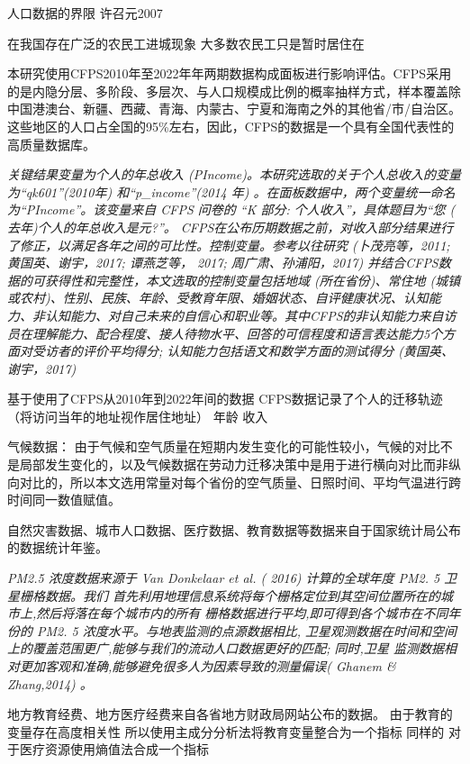 \documentclass[a4paper,12pt,oneside, fontset=mac]{ctexbook} %
\begin{document}
人口数据的界限
许召元2007

在我国存在广泛的农民工进城现象 大多数农民工只是暂时居住在


本研究使用CFPS2010年至2022年年两期数据构成面板进行影响评估。CFPS采用的是内隐分层、多阶段、多层次、与人口规模成比例的概率抽样方式，样本覆盖除中国港澳台、新疆、西藏、青海、内蒙古、宁夏和海南之外的其他省/市/自治区。这些地区的人口占全国的95\%左右，因此，CFPS的数据是一个具有全国代表性的高质量数据库。

\textit{关键结果变量为个人的年总收入 (PIncome)。本研究选取的关于个人总收入的变量为“qk601”(2010年) 和“p\_income”(2014 年) 。在面板数据中，两个变量统一命名为“PIncome”。该变量来自 CFPS 问卷的 “K 部分: 个人收入”，具体题目为“您 ( 去年)个人的年总收入是元?”。
CFPS在公布历期数据之前，对收入部分结果进行了修正，以满足各年之间的可比性。控制变量。参考以往研究 (卜茂亮等，2011; 黄国英、谢宇，2017; 谭燕芝等， 2017; 周广肃、孙浦阳，2017) 并结合CFPS数据的可获得性和完整性，本文选取的控制变量包括地域 (所在省份)、常住地 (城镇或农村)、性别、民族、年龄、受教育年限、婚姻状态、自评健康状况、认知能力、非认知能力、对自己未来的自信心和职业等。其中CFPS的非认知能力来自访员在理解能力、配合程度、接人待物水平、回答的可信程度和语言表达能力5个方面对受访者的评价平均得分; 认知能力包括语文和数学方面的测试得分 (黄国英、谢宇，2017)}


基于使用了CFPS从2010年到2022年间的数据
CFPS数据记录了个人的迁移轨迹（将访问当年的地址视作居住地址）
年龄
收入


气候数据：
由于气候和空气质量在短期内发生变化的可能性较小，气候的对比不是局部发生变化的，以及气候数据在劳动力迁移决策中是用于进行横向对比而非纵向对比的，所以本文选用常量对每个省份的空气质量、日照时间、平均气温进行跨时间同一数值赋值。


自然灾害数据、城市人口数据、医疗数据、教育数据等数据来自于国家统计局公布的数据统计年鉴。

\textit{PM2.5 浓度数据来源于 Van Donkelaar et al. ( 2016) 计算的全球年度 PM2. 5 卫星栅格数据。我们 首先利用地理信息系统将每个栅格定位到其空间位置所在的城市上,然后将落在每个城市内的所有 栅格数据进行平均,即可得到各个城市在不同年份的 PM2. 5 浓度水平。与地表监测的点源数据相比, 卫星观测数据在时间和空间上的覆盖范围更广,能够与我们的流动人口数据更好的匹配; 同时,卫星 监测数据相对更加客观和准确,能够避免很多人为因素导致的测量偏误( Ghanem \& Zhang,2014) 。}


地方教育经费、地方医疗经费来自各省地方财政局网站公布的数据。
由于教育的变量存在高度相关性
所以使用主成分分析法将教育变量整合为一个指标
同样的
对于医疗资源使用熵值法合成一个指标
\end{document}
